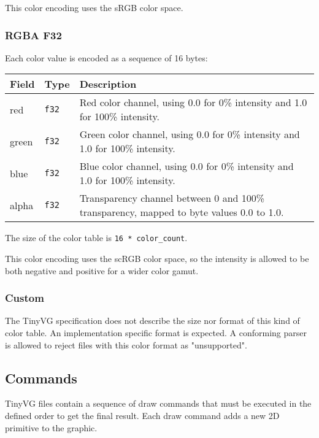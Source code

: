 \documentclass[]{article}
\begin{document}
This color encoding uses the sRGB color space.

\hypertarget{rgba-f32}{\subsubsection{RGBA F32}\label{rgba-f32}}

Each color value is encoded as a sequence of 16 bytes:

\begin{longtable}[]{@{}p{0.5in}p{0.5in}p{5.0in}@{}}
\toprule
Field & Type & Description \\
\midrule
\endhead
red   & \texttt{f32} & Red color channel, using 0.0 for 0\% intensity and 1.0 for 100\% intensity. \\
green & \texttt{f32} & Green color channel, using 0.0 for 0\% intensity and 1.0 for 100\% intensity. \\
blue  & \texttt{f32} & Blue color channel, using 0.0 for 0\% intensity and 1.0 for 100\% intensity. \\
alpha & \texttt{f32} & Transparency channel between 0 and 100\% transparency, mapped to byte values 0.0 to 1.0. \\
\bottomrule
\end{longtable}

The size of the color table is \texttt{16\ *\ color\_count}.

This color encoding uses the scRGB color space, so the intensity is allowed to be both negative and positive for a wider color gamut.

\hypertarget{custom}{\subsubsection{Custom}\label{custom}}

The TinyVG specification does not describe the size nor format of this
kind of color table. An implementation specific format is expected. A
conforming parser is allowed to reject files with this color format as
"unsupported".

\hypertarget{commands}{\subsection{Commands}\label{commands}}

TinyVG files contain a sequence of draw commands that must be executed
in the defined order to get the final result. Each draw command adds a
new 2D primitive to the graphic.
\end{document}
